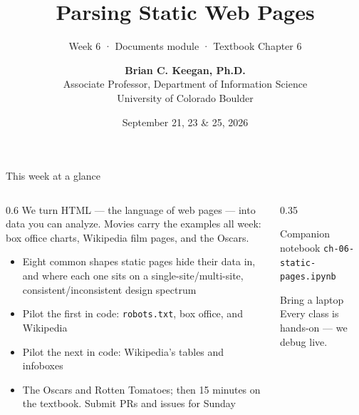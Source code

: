 \documentclass[9pt,aspectratio=169]{beamer}
\title[Week 6 · Static Pages]{{\Huge Parsing Static Web Pages}}
\subtitle{Week 6 · Documents module · Textbook Chapter 6}
\author[Keegan]{\textbf{Brian C. Keegan, Ph.D.} \\ Associate Professor, Department of Information Science \\ University of Colorado Boulder}
\date{September 21, 23 \& 25, 2026}
\begin{document}
\maketitle

\begin{frame}{This week at a glance}
    \begin{columns}
        \begin{column}{0.6\textwidth}
            We turn HTML --- the language of web pages --- into data you can analyze. Movies carry the examples all week: box office charts, Wikipedia film pages, and the Oscars.

            \bigskip

            \begin{itemize}\small
                \item Eight common shapes static pages hide their data in, and where each one sits on a single-site/multi-site, consistent/inconsistent design spectrum
                \item Pilot the first in code: \texttt{robots.txt}, box office, and Wikipedia
            \end{itemize}

            \medskip

            \begin{itemize}\small
                \item Pilot the next in code: Wikipedia's tables and infoboxes
            \end{itemize}

            \medskip

            \begin{itemize}\small
                \item The Oscars and Rotten Tomatoes; then 15 minutes on the textbook. Submit PRs and issues for Sunday
            \end{itemize}
        \end{column}
        \begin{column}{0.35\textwidth}
            \begin{block}{Companion notebook}
                \footnotesize \texttt{ch-06-static-pages.ipynb}
            \end{block}
            \begin{alertblock}{Bring a laptop}
                \footnotesize Every class is hands-on --- we debug live.
            \end{alertblock}
        \end{column}
    \end{columns}
\end{frame}
\end{document}
